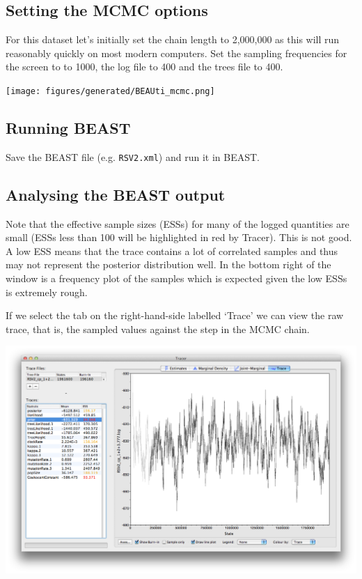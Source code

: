 \documentclass[12pt]{article}
\begin{document}
\subsection{Setting the MCMC options}

For this dataset let's initially set the chain length to 2,000,000 as this will run 
reasonably quickly on most modern computers. Set the sampling frequencies for the screen to
to 1000, the log file to 400 and the trees file to 400.

\begin{center}
\texttt{[image: figures/generated/BEAUti\_mcmc.png]}
\end{center}


\subsection*{Running BEAST}

Save the BEAST file (e.g. \texttt{RSV2.xml}) and run it in BEAST.

\subsection*{Analysing the BEAST output}

Note that the effective sample sizes (ESSs) for many of the logged quantities are small (ESSs less than 100 will be highlighted in red by Tracer).
This is not good. A low ESS means that the trace contains a lot of correlated samples and thus may not represent the
posterior distribution well. In the bottom right of the window is a frequency plot of the samples which is expected given the
low ESSs is extremely rough.

If we select the tab on the right-hand-side labelled `Trace' we can view the raw trace, that is, the sampled values against the step in the MCMC chain.

\medskip{}

\includegraphics[width=\textwidth]{figures/Tracer1}
\end{document}
